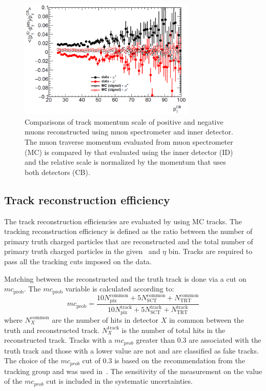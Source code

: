 \begin{figure}[h]
\centerline{
\includegraphics[width=0.75\textwidth]{figures/main/corrections/MuonPerf.pdf}
}
\caption{Comparisons of track momentum scale of positive and negative muons reconstructed using muon spectrometer and inner detector. The muon traverse momentum evaluated from muon spectrometer (MC) is compared by that evaluated using the inner detector (ID) and the relative scale is normalized by the momentum that uses both detectors (CB). \cite{Bold:2194917}}
\label{Fig:ChMomentumScale}
\end{figure}



\subsection{Track reconstruction efficiency}
\label{sec:trackreco}

The track reconstruction efficiencies are evaluated by using MC tracks. The tracking reconstruction efficiency is defined as the ratio between the number of primary truth charged particles that are reconstructed and the total number of primary truth charged particles in the given \pt\ and $\eta$ bin. Tracks are required to pass all the tracking cuts imposed on the data. 

Matching between the reconstructed and the truth track is done via a cut on $mc_{\mathrm{prob}}$. The $mc_{\mathrm{prob}}$ variable is calculated according to:
\begin{equation}
mc_{\mathrm{prob}} = \frac{10N^{\mathrm{common}}_{\mathrm{pix}} + 5N^{\mathrm{common}}_{\mathrm{SCT}} + N^{\mathrm{common}}_{\mathrm{TRT}}}{10N^{\mathrm{track}}_{\mathrm{pix}} + 5 N^{\mathrm{track}}_{\mathrm{SCT}} + N^{\mathrm{track}}_{\mathrm{TRT}}
\label{eq:mc_prob}}
\end{equation}
 where $N^{\mathrm{common}}_X$  are the number of hits in detector $X$ in common between the truth and reconstructed track.  $N^{\mathrm{track}}_X$ is the number
of total hits in the reconstructed track.  
Tracks with a $mc_{prob}$ greater than 0.3 are associated with the truth track and those with a lower value are not and are classified as fake tracks. The choice of the $mc_{prob}$ cut of 0.3 is based on the recommendation from the tracking group and was used in~\cite{201865}. The sensitivity of the measurement on the value of the $mc_{prob}$ cut is included in the systematic uncertainties.

